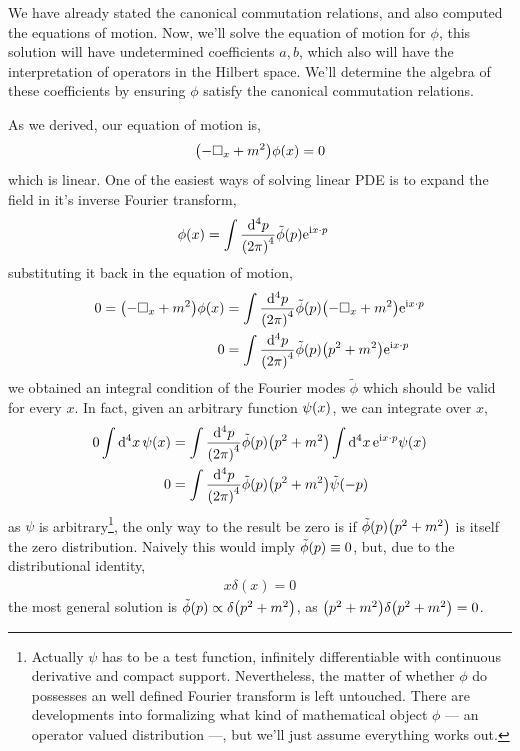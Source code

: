 We have already stated the canonical commutation relations, and also computed 
the equations of motion. Now, we'll solve the equation of motion for $\phi$, 
this solution will have undetermined coefficients $a,b$, which also will have 
the interpretation of operators in the Hilbert space. We'll determine the algebra 
of these coefficients by ensuring $\phi$ satisfy the canonical commutation relations.

As we derived, our equation of motion is,
\begin{align}
    \qty(-\Box_x+m^2)\phi\qty(x)=0
\end{align}
which is linear. One of the easiest ways of solving linear PDE is 
to expand the field in it's inverse Fourier transform,
\begin{align}
    \phi\qty(x)&=\int\frac{\dd[4]{p}}{\qty(2\pi)^4}\tilde \phi\qty(p)\textnormal{e}^{\textnormal{i} x\cdot p}
\end{align}
substituting it back in the equation of motion,
\begin{align}
    0=\qty(-\Box_x+m^2)\phi\qty(x)&=\int\frac{\dd[4]{p}}{\qty(2\pi)^4}\tilde \phi\qty(p)\qty(-\Box_x+m^2)\textnormal{e}^{\textnormal{i} x\cdot p}\\
    0&=\int\frac{\dd[4]{p}}{\qty(2\pi)^4}\tilde \phi\qty(p)\qty(p^2+m^2)\textnormal{e}^{\textnormal{i} x\cdot p}
\end{align}
we obtained an integral condition of the Fourier modes $\tilde\phi$ which should be valid for every $x$. In fact, given an arbitrary function $\psi\qty(x)$, we can integrate over $x$,
\begin{align}
    0\int\dd[4]{x}\psi(x)&=\int\frac{\dd[4]{p}}{\qty(2\pi)^4}\tilde \phi\qty(p)\qty(p^2+m^2)\int\dd[4]{x}\textnormal{e}^{\textnormal{i} x\cdot p}\psi(x)\\
    0&=\int\frac{\dd[4]{p}}{\qty(2\pi)^4}\tilde \phi\qty(p)\qty(p^2+m^2)\tilde\psi(-p)
\end{align}
as $\psi$ is arbitrary\footnote{Actually $\psi$ has to be a test function, infinitely differentiable with continuous derivative and compact support. Nevertheless, the matter of whether $\phi$ do possesses an well defined Fourier transform is left untouched. 
There are developments into formalizing what kind of mathematical object $\phi$ --- an operator valued distribution ---, but we'll just assume 
everything works out.}, the only way to the result be zero is if $\tilde \phi\qty(p)\qty(p^2+m^2)$ is itself 
the zero distribution. Naively this would imply $\tilde \phi\qty(p) \equiv 0$, but, due to the distributional 
identity, \begin{align}x\delta(x)=0\end{align} the most general solution is $\tilde \phi\qty(p) \propto \delta\qty(p^2+m^2)$, as $\qty(p^2+m^2)\delta\qty(p^2+m^2)=0$. 
